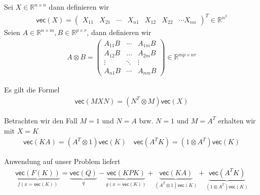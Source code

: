 \documentclass[a4paper, 12pt]{scrartcl}
\begin{document}
\begin{definition}
    Sei $X \in \mathbb{R}^{n \times n}$ dann definieren wir 
    \begin{align*}
    \textsf{vec}(X) = 
    \begin{pmatrix}
    X_{11} & X_{21} & \cdots & X_{n1} & X_{12} & X_{22} & \cdots X_{nn}  
    \end{pmatrix}^T 
    \in 
    \mathbb{R}^{n^2}
    \end{align*}
    Seien $A \in \mathbb{R}^{n \times m}, B \in \mathbb{R}^{p \times r}$, dann definieren wir 
    \begin{align*}
    A \otimes B =
    \begin{pmatrix}
    A_{11} B 	& \cdots 	& A_{1m} B 	\\
    A_{12} B 	& \hdots 	& A_{2m} B	\\
    \vdots		& \ddots	& \vdots	\\
    A_{n1} B	& \cdots	& A_{nm} B
    \end{pmatrix}
    \in 
    \mathbb{R}^{mp \times nr}
    \end{align*}
\end{definition}

Es gilt die Formel
%
\begin{align*}
    \textsf{vec}(MXN) = (N^T \otimes M) \textsf{vec}(X)  
\end{align*}

Betrachten wir den Fall $M= 1$ und $N=A$ bzw. $N = 1$ und $M=A^T$ erhalten wir mit $X=K$ 
%
\begin{align*}
    \textsf{vec}(KA)= (A^T \otimes 1) \textsf{vec}(K) \quad \textsf{vec}(A^T K) = (1 \otimes A^T) \textsf{vec}(K)
\end{align*}

Anwendung auf unser Problem liefert
%
\begin{align*}
    \underbrace{
        \textsf{vec}(F(K))
    }_{
        f(x = \textsf{vec}(K))
    } 
    = 
    \underbrace{
        \textsf{vec}(Q)
    }_{q} 
    - 
    \underbrace{
        \textsf{vec}(KPK)
    }_{
        g(x = \textsf{vec}(K))
    } 
    + 
    \underbrace{
        \textsf{vec}(KA)
    }_{
        (A^T \otimes 1) \textsf{vec}(K)
    } 
    + 
    \underbrace{
        \textsf{vec}(A^T K)
    }_{
        (1 \otimes A^T) \textsf{vec}(K)
    }
\end{align*}
\end{document}
